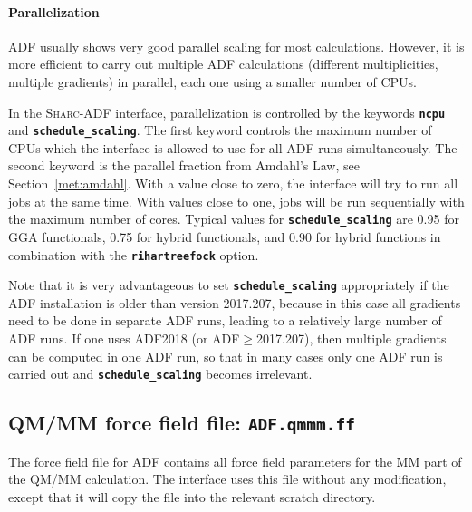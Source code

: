 \documentclass[a4paper,10pt,DIV=15,openany]{scrbook}
\newcommand{\sharc}{\textsc{Sharc}}
\newcommand{\ttt}[1]{\textbf{\texttt{#1}}}
\begin{document}
\paragraph{Parallelization}

ADF usually shows very good parallel scaling for most calculations.
However, it is more efficient to carry out multiple ADF calculations (different multiplicities, multiple gradients) in parallel, each one using a smaller number of CPUs.

In the \sharc-ADF interface, parallelization is controlled by the keywords \ttt{ncpu} and \ttt{schedule\_scaling}.
The first keyword controls the maximum number of CPUs which the interface is allowed to use for all ADF runs simultaneously.
The second keyword is the parallel fraction from Amdahl's Law, see Section~\ref{met:amdahl}.
With a value close to zero, the interface will try to run all jobs at the same time. With values close to one, jobs will be run sequentially with the maximum number of cores.
Typical values for \ttt{schedule\_scaling} are 0.95 for GGA functionals, 0.75 for hybrid functionals, and 0.90 for hybrid functions in combination with the \ttt{rihartreefock} option.

Note that it is very advantageous to set \ttt{schedule\_scaling} appropriately if the ADF installation is older than version 2017.207, because in this case all gradients need to be done in separate ADF runs, leading to a relatively large number of ADF runs.
If one uses ADF2018 (or ADF$\geq$2017.207), then multiple gradients can be computed in one ADF run, so that in many cases only one ADF run is carried out and \ttt{schedule\_scaling} becomes irrelevant.





\subsection{QM/MM force field file: \ttt{ADF.qmmm.ff}}

The force field file for ADF contains all force field parameters for the MM part of the QM/MM calculation.
The interface uses this file without any modification, except that it will copy the file into the relevant scratch directory.
\end{document}

